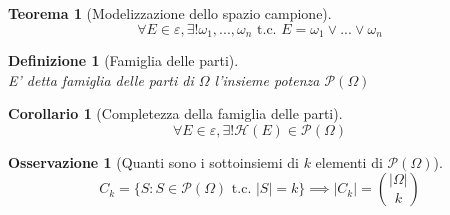 \documentclass{article}
\newtheorem{theorem}{Teorema}[section]
\newtheorem{corollary}{Corollario}[theorem]
\newtheorem{definition}{Definizione}[section]
\newtheorem{osservation}{Osservazione}[section]
\begin{document}
    \begin{theorem}[Modelizzazione dello spazio campione]
        $$\forall E \in \varepsilon, \exists! \omega_1, ..., \omega_n \textrm{ t.c. }
            E = \omega_1 \lor ... \lor \omega_n
        $$
    \end{theorem}
    \begin{definition}[Famiglia delle parti] \, \\
        E' detta famiglia delle parti di $\Omega$ l'insieme potenza $\mathcal{P}\left(\Omega\right)$
    \end{definition}
    \begin{corollary}[Completezza della famiglia delle parti]
        $$\forall E \in \varepsilon, \exists! \mathcal{H}\left(E\right) \in \mathcal{P}\left(\Omega\right)$$
    \end{corollary}
    \begin{osservation}[Quanti sono i sottoinsiemi di $k$ elementi di $\mathcal{P}\left(\Omega\right)$]
        $$C_k = \{S: S \in \mathcal{P}\left(\Omega\right) \textrm{ t.c. } |S| = k\} \implies |C_k| = \binom{|\Omega|}{k}$$
    \end{osservation}
\end{document}
